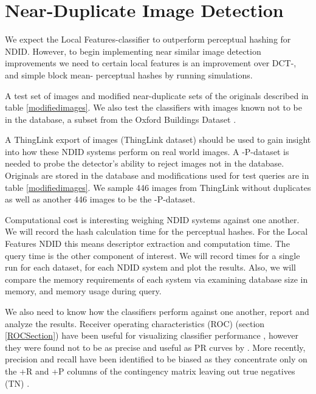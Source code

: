 \documentclass[english,12pt,a4paper,pdftex,elec,utf8, table]{aaltothesis}
\begin{document}
\clearpage

\section{Near-Duplicate Image Detection} \label{NDID}
We expect the Local Features-classifier to outperform perceptual hashing for NDID. However, to begin implementing near similar image detection improvements we need to certain local features is an improvement over DCT-, and simple block mean- perceptual hashes by running simulations.

A test set of images and modified near-duplicate sets of the originals described in table \ref{modifiedimages}. We also test the classifiers with images known not to be in the database, a subset from the Oxford Buildings Dataset \cite{PhilbinJamesArandjelovicReljaZisserman2012}.

A ThingLink export of images (ThingLink dataset) should be used to gain insight into how these NDID systems perform on real world images. A -P-dataset is needed to probe the detector's ability to reject images not in the database. Originals are stored in the database and modifications used for test queries are in table \ref{modifiedimages}. We sample 446 images from ThingLink without duplicates as well as another 446 images to be the -P-dataset.

Computational cost is interesting weighing NDID systems against one another. We will record the hash calculation time for the perceptual hashes. For the Local Features NDID this means descriptor extraction and computation time. The query time is the other component of interest. We will record times for a single run for each dataset, for each NDID system and plot the results. Also, we will compare the memory requirements of each system via examining database size in memory, and memory usage during query.

We also need to know how the classifiers perform against one another, report and analyze the results. Receiver operating characteristics (ROC) (section \ref{ROCSection}) have been useful for visualizing classifier performance \cite{Fawcett2006}, however they were found not to be as precise and useful as PR curves by \cite{Davis2006}. More recently, precision and recall have been identified to be biased as they concentrate only on the +R and +P columns of the contingency matrix leaving out true negatives (TN) \cite{POWERS2011}.
\end{document}
